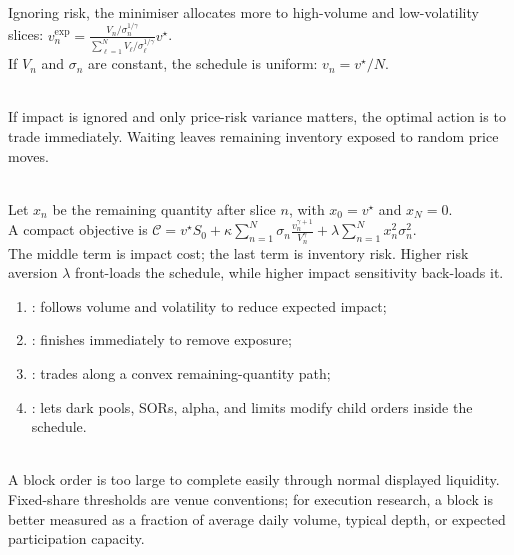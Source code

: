 \documentclass[a4paper,oneside,openany]{book}
\begin{document}
\begin{definition} \\
Ignoring risk, the minimiser allocates more to high-volume and low-volatility slices: $v_n^{\mathrm{exp}} =\frac{V_n/\sigma_n^{1/\gamma}}{\sum\limits_{\ell=1}^{N}V_\ell/\sigma_\ell^{1/\gamma}}v^\star$.\\
If $V_n$ and $\sigma_n$ are constant, the schedule is uniform: $v_n=v^\star/N$.
\end{definition}

\begin{mechanism} \\
If impact is ignored and only price-risk variance matters, the optimal action is to trade immediately. Waiting leaves remaining inventory exposed to random price moves.
\end{mechanism}

\begin{model} \\
Let $x_n$ be the remaining quantity after slice $n$, with $x_0=v^\star$ and $x_N=0$.\\
A compact objective is $\mathcal{C} =v^\star S_0 +\kappa\sum\limits_{n=1}^{N}\sigma_n\frac{v_n^{\gamma+1}}{V_n^\gamma} +\lambda\sum\limits_{n=1}^{N}x_n^2\sigma_n^2$.\\
The middle term is impact cost; the last term is inventory risk. Higher risk aversion $\lambda$ front-loads the schedule, while higher impact sensitivity back-loads it.
\end{model}

\begin{taxonomy} 
\begin{enumerate}[label=\roman*.]
\setlength{\itemsep}{0pt}
\item {}: follows volume and volatility to reduce expected impact;
\item {}: finishes immediately to remove exposure;
\item {}: trades along a convex remaining-quantity path;
\item {}: lets dark pools, SORs, alpha, and limits modify child orders inside the schedule.
\end{enumerate}
\end{taxonomy}

\begin{definition} \\
A block order is too large to complete easily through normal displayed liquidity.\\
Fixed-share thresholds are venue conventions; for execution research, a block is better measured as a fraction of average daily volume, typical depth, or expected participation capacity.
\end{definition}
\end{document}
